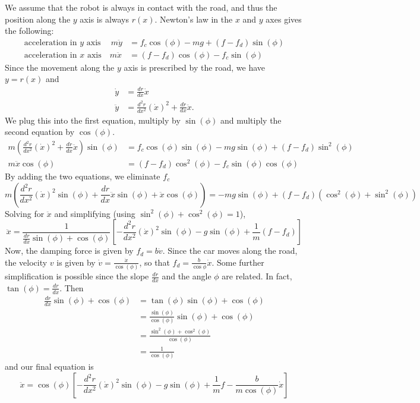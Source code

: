 We assume that the robot is always in contact with the road, and thus the position along the $y$ axis is always $r(x)$. Newton's law in the $x$ and $y$ axes gives the following:
\begin{align*}
 {\mbox{acceleration in $y$ axis}} \quad\ m\ddot{y} &= f_{c}\cos(\phi) - mg + (f-f_{d})\sin(\phi)  \\
 {\mbox{acceleration in $x$ axis}} \quad m\ddot{x} &= (f-f_{d})\cos(\phi) - f_{c}\sin(\phi) 
\end{align*}
Since the movement along the $y$ axis is prescribed by the road, we have $y=r(x)$ and
\begin{align*}
\dot y &= \frac{dr}{dx}\dot{x}\\
\ddot y &= \frac{d^2r}{dx^{2}}(\dot{x})^2+\frac{dr}{dx}\ddot{x}.
\end{align*}
We plug this into the first equation, multiply by $\sin(\phi)$ and multiply the second equation by $\cos(\phi)$. 
\begin{align*}
m\left(\frac{d^2r}{dx^{2}}(\dot{x})^2+\frac{dr}{dx}\ddot{x}\right)\sin(\phi) &= f_{c}\cos(\phi)\sin(\phi) - mg\sin(\phi) + (f-f_{d})\sin^2(\phi) \\
m\ddot{x}\cos(\phi) &= (f-f_{d})\cos^2(\phi)- f_{c}\sin(\phi)\cos(\phi) 
\end{align*}
By adding the two equations, we eliminate $f_{c}$
\[
m\left(\frac{d^2r}{dx^{2}}(\dot{x})^2\sin(\phi)+\frac{dr}{dx}\ddot{x}\sin(\phi) + \ddot{x}\cos(\phi)\right) =  - mg\sin(\phi) + (f-f_{d})(\cos^{2}(\phi) +\sin^2(\phi)) 
\]
Solving for $\ddot{x}$ and simplifying (using $\sin^{2}(\phi) + \cos^2(\phi)=1$),
\[
\ddot{x} = \frac{1}{\frac{dr}{dx}\sin(\phi) + \cos(\phi)}\left[ -\frac{d^2r}{dx^{2}}(\dot{x})^2\sin(\phi) - g\sin(\phi) + \frac{1}{m}(f-f_{d})\right] 
\]
Now, the damping force is given by $f_{d} = b\dot{v}$. Since the car moves along the road, the velocity $v$ is given by  $\dot{v}=\frac{\dot{x}}{\cos(\phi)}$, so that $f_{d} = \frac{b}{\cos{\phi}}\dot{x}$.
Some further simplification is possible since the slope $\frac{dr}{dx}$ and the angle $\phi$ are related. In fact, $\tan(\phi) = \frac{dr}{dx}$. Then
\begin{align*}
\frac{dr}{dx}\sin(\phi) + \cos(\phi) &= \tan(\phi)\sin(\phi) + \cos(\phi) \\
& = \frac{\sin(\phi)}{\cos(\phi)}\sin(\phi) + \cos(\phi) \\
& = \frac{\sin^2(\phi) + \cos^2(\phi)}{\cos(\phi)}\\
& = \frac{1}{\cos(\phi)}
\end{align*}
and our final equation is 
\[
\ddot{x} = \cos(\phi)\left[ -\frac{d^2r}{dx^{2}}(\dot{x})^2\sin(\phi) - g\sin(\phi) + \frac{1}{m}f - \frac{b}{m\cos(\phi)}\dot{x}\right] 
\]





